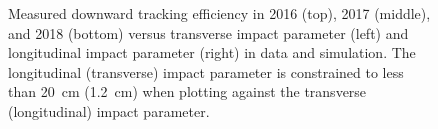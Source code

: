 \begin{figure}[hbtp]
\caption{Measured downward tracking efficiency in 2016 (top), 2017 (middle), and 2018 (bottom) versus transverse impact parameter (left) and longitudinal impact parameter (right) in data and simulation. The longitudinal (transverse) impact parameter is constrained to less than \SI{20}{\cm} (\SI{1.2}{\cm}) when plotting against the transverse (longitudinal) impact parameter.}
\label{displaced_trk_eff_vs_d0dz}
\end{figure}